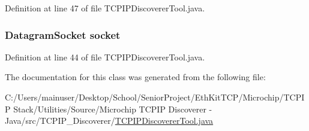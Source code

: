 Definition at line 47 of file T\+C\+P\+I\+P\+Discoverer\+Tool.\+java.

\hypertarget{class_t_c_p_i_p___discoverer_1_1_t_c_p_i_p_discoverer_tool_a2e854196cd879b68fc586353de052352}{}
\subsubsection[{socket}]{\setlength{\rightskip}{0pt plus 5cm}Datagram\+Socket socket\hspace{0.3cm}{\ttfamily [static]}}\label{class_t_c_p_i_p___discoverer_1_1_t_c_p_i_p_discoverer_tool_a2e854196cd879b68fc586353de052352}


Definition at line 44 of file T\+C\+P\+I\+P\+Discoverer\+Tool.\+java.



The documentation for this class was generated from the following file\+:\begin{DoxyCompactItemize}
\item 
C\+:/\+Users/mainuser/\+Desktop/\+School/\+Senior\+Project/\+Eth\+Kit\+T\+C\+P/\+Microchip/\+T\+C\+P\+I\+P Stack/\+Utilities/\+Source/\+Microchip T\+C\+P\+I\+P Discoverer -\/ Java/src/\+T\+C\+P\+I\+P\+\_\+\+Discoverer/\hyperlink{_t_c_p_i_p_discoverer_tool_8java}{T\+C\+P\+I\+P\+Discoverer\+Tool.\+java}\end{DoxyCompactItemize}
